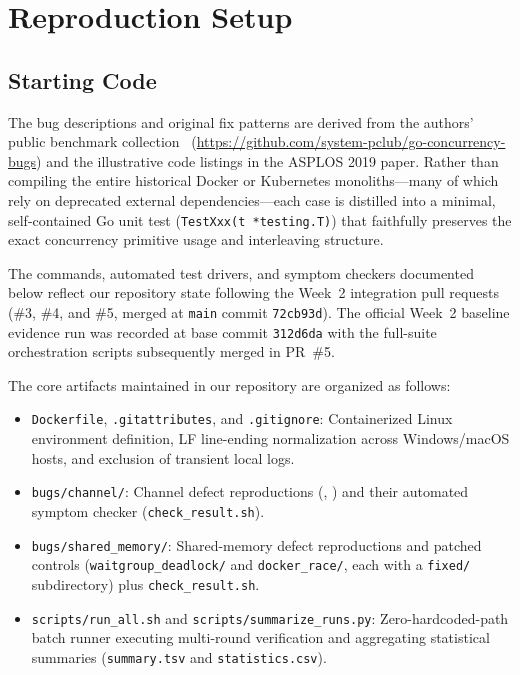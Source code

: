 \section{Reproduction Setup}
\label{sec:setup}

\subsection{Starting Code}
The bug descriptions and original fix patterns are derived from the authors' public benchmark collection~\cite{gobugsrepo} (\url{https://github.com/system-pclub/go-concurrency-bugs}) and the illustrative code listings in the ASPLOS 2019 paper. Rather than compiling the entire historical Docker or Kubernetes monoliths—many of which rely on deprecated external dependencies—each case is distilled into a minimal, self-contained Go unit test (\texttt{TestXxx(t *testing.T)}) that faithfully preserves the exact concurrency primitive usage and interleaving structure.

The commands, automated test drivers, and symptom checkers documented below reflect our repository state following the Week~2 integration pull requests (\#3, \#4, and \#5, merged at \texttt{main} commit \texttt{72cb93d}). The official Week~2 baseline evidence run was recorded at base commit \texttt{312d6da} with the full-suite orchestration scripts subsequently merged in PR~\#5.

The core artifacts maintained in our repository are organized as follows:
\begin{itemize}
  \item \texttt{Dockerfile}, \texttt{.gitattributes}, and \texttt{.gitignore}: Containerized Linux environment definition, LF line-ending normalization across Windows/macOS hosts, and exclusion of transient local logs.
  \item \texttt{bugs/channel/}: Channel defect reproductions (, ) and their automated symptom checker (\texttt{check\_result.sh}).
  \item \texttt{bugs/shared\_memory/}: Shared-memory defect reproductions and patched controls (\texttt{waitgroup\_deadlock/} and \texttt{docker\_race/}, each with a \texttt{fixed/} subdirectory) plus \texttt{check\_result.sh}.
  \item \texttt{scripts/run\_all.sh} and \texttt{scripts/summarize\_runs.py}: Zero-hardcoded-path batch runner executing multi-round verification and aggregating statistical summaries (\texttt{summary.tsv} and \texttt{statistics.csv}).
\end{itemize}

